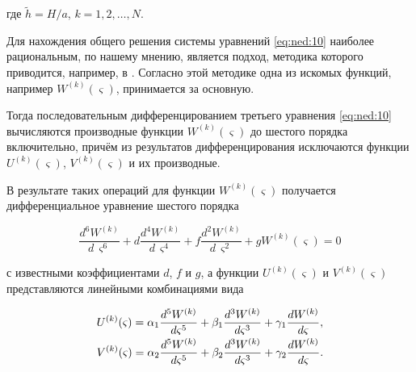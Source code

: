 где $\tilde h={H/{a}}$, $k= 1, 2, \dots, N$.



Для нахождения общего решения системы уравнений \eqref{eq:ned:10} наиболее рациональным, по нашему мнению, является подход, методика которого приводится, например, в \cite[стр. 153--158]{ned2}. Согласно этой методике одна из искомых функций, например $W^{(k)}(\varsigma)$, принимается за основную.

Тогда последовательным дифференцированием третьего уравнения \eqref{eq:ned:10} вычисляются производные функции $W^{(k)}(\varsigma)$ до шестого порядка включительно, причём из результатов дифференцирования исключаются функции $U^{(k)}(\varsigma)$, $V^{(k)}(\varsigma)$ и их производные. 

В результате таких операций для функции $W^{(k)}(\varsigma)$ получается дифференциальное уравнение шестого порядка

\begin{equation}

\label{eq:ned:11}

\frac{{d^6 W^{(k)}}}{{d\,\varsigma ^6}}+d\frac{{d^4 W^{(k)}}}{{d\,\varsigma ^4}}+f\frac{{d^2 W^{(k)}}}{{d\,\varsigma ^2}}+gW^{(k)}(\varsigma)=0

\end{equation}

с известными коэффициентами $d$, $f$ и $g$, а функции $U^{(k)}(\varsigma)$ и $V^{(k)}(\varsigma)$ представляются линейными комбинациями вида

\begin{equation}

\label{eq:ned:12}

\begin{array}{l}

\displaystyle U^{(k)}(\varsigma)=\alpha_1\frac{{d^5 W^{(k)}}}{{d\varsigma ^5}}+\beta_1\frac{{d^3 W^{(k)}}}{{d\varsigma ^3}}+\gamma_1\frac{{dW^{(k)}}}{{d\varsigma}}, \vspace{1mm} \\

%

\displaystyle V^{(k)}(\varsigma)=\alpha_2\frac{{d^5 W^{(k)}}}{{d\varsigma ^5}}+\beta_2\frac{{d^3 W^{(k)}}}{{d\varsigma ^3}}+\gamma_2\frac{{dW^{(k)}}}{{d\varsigma}}.

\end{array}

\end{equation}



